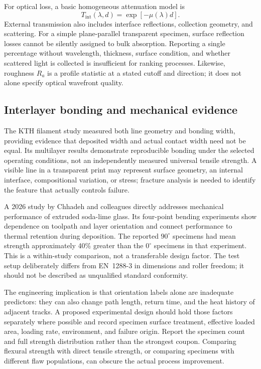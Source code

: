 For optical loss, a basic homogeneous attenuation model is
\begin{equation}
 T_{\mathrm{int}}(\lambda,d)=\exp[-\mu(\lambda)d].
\end{equation}
External transmission also includes interface reflections, collection geometry, and scattering. For a simple plane-parallel transparent specimen, surface reflection losses cannot be silently assigned to bulk absorption. Reporting a single percentage without wavelength, thickness, surface condition, and whether scattered light is collected is insufficient for ranking processes. Likewise, roughness $R_a$ is a profile statistic at a stated cutoff and direction; it does not alone specify optical wavefront quality.

\subsection{Interlayer bonding and mechanical evidence}
The KTH filament study measured both line geometry and bonding width, providing evidence that deposited width and actual contact width need not be equal. Its multilayer results demonstrate reproducible bonding under the selected operating conditions, not an independently measured universal tensile strength.\cite{acad_liu2022} A visible line in a transparent print may represent surface geometry, an internal interface, compositional variation, or stress; fracture analysis is needed to identify the feature that actually controls failure.

A 2026 study by Chhadeh and colleagues directly addresses mechanical performance of extruded soda-lime glass. Its four-point bending experiments show dependence on toolpath and layer orientation and connect performance to thermal retention during deposition. The reported $90^\circ$ specimens had mean strength approximately 40\% greater than the $0^\circ$ specimens in that experiment. This is a within-study comparison, not a transferable design factor. The test setup deliberately differs from EN~1288-3 in dimensions and roller freedom; it should not be described as unqualified standard conformity.\cite{acad_chhadeh2026}

The engineering implication is that orientation labels alone are inadequate predictors: they can also change path length, return time, and the heat history of adjacent tracks. A proposed experimental design should hold those factors separately where possible and record specimen surface treatment, effective loaded area, loading rate, environment, and failure origin. Report the specimen count and full strength distribution rather than the strongest coupon. Comparing flexural strength with direct tensile strength, or comparing specimens with different flaw populations, can obscure the actual process improvement.

